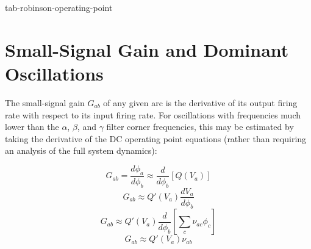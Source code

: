 {tab-robinson-operating-point}

%
%
\section{Small-Signal Gain and Dominant Oscillations}
\label{sect-robinson-math-gain}

The small-signal gain $G_{ab}$ of any given arc is the derivative of its
output firing rate with respect to its input firing rate. For oscillations
with frequencies much lower than the $\alpha$, $\beta$, and $\gamma$ filter
corner frequencies, this may be estimated by taking the derivative of the
DC operating point equations (rather than requiring an analysis of the full
system dynamics):

\begin{equation}
G_{ab} = \frac{d\phi_a}{d\phi_b}
\approx \frac{d}{d\phi_b} \left [ Q(V_a) \right ]
\end{equation}
%
\begin{equation}
G_{ab} \approx Q'(V_a) \frac{dV_a}{d\phi_b}
\end{equation}
%
\begin{equation}
G_{ab} \approx
Q'(V_a) \frac{d}{d\phi_b} \left [ \sum_c \nu_{ac} \phi_c \right ]
\end{equation}
%
\begin{equation}
G_{ab} \approx Q'(V_a) \nu_{ab}
\label{eq-robinson-gain-qprime}
\end{equation}

